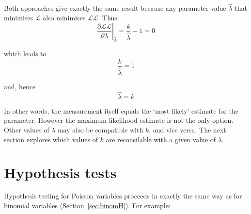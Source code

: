 Both approaches give exactly the same result because any parameter
value $\hat{\lambda}$ that minimises $\mathcal{L}$ also minimises
$\mathcal{LL}$.  Thus:
\begin{equation}
  \left.\frac{\partial{\mathcal{LL}}}{\partial{\lambda}}\right|_{\hat{\lambda}} =
  \frac{k}{\hat{\lambda}} - 1 = 0
\end{equation}

\noindent which leads to
\begin{equation}
  \frac{k}{\hat{\lambda}} = 1
\end{equation}

\noindent and, hence
\begin{equation}
  \hat{\lambda} = k
  \label{eq:lambda=k}
\end{equation}

In other words, the measurement itself equals the `most likely'
estimate for the parameter. However the maximum likelihood estimate is
not the only option. Other values of $\lambda$ may also be compatible
with $k$, and vice versa. The next section explores which values of
$k$ are reconsilable with a given value of $\lambda$.

\section{Hypothesis tests}
\label{sec:poishyp}

Hypothesis testing for Poisson variables proceeds in exactly the same
way as for binomial variables (Section~\ref{sec:binomH}). For example:

